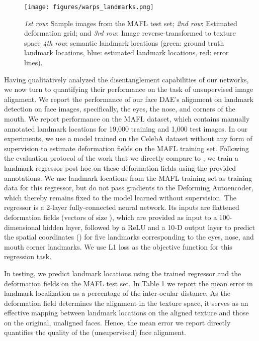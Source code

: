 \documentclass[runningheads]{llncs}
\begin{document}
\begin{figure}[!h]
    \centering
    \texttt{[image: figures/warps\_landmarks.png]}
    \caption{\emph{1st row}: Sample images from the MAFL test set; \emph{2nd row}:
    Estimated deformation grid; and \emph{3rd row}: Image reverse-transformed to texture space \emph{4th row}: semantic landmark locations (green: ground truth landmark locations, 
    blue: estimated landmark locations,
    red: error lines).}
    \label{fig:landmarksAndKeypoints}
\end{figure}
Having qualitatively analyzed the disentanglement capabilities of our networks, we now turn to quantifying their performance on the task of unsupervised image alignment. 
We report the performance of our face DAE's alignment on landmark detection on face images, specifically, the eyes, the nose, and corners of the mouth. 
We report performance on the MAFL dataset, which contains manually annotated landmark locations for 19,000 training and 1,000 test images.
In our experiments, we use a model trained on the CelebA dataset without any form of supervision to estimate deformation fields on the MAFL training set. Following the evaluation protocol of the work that we directly compare to \cite{ThewlisBV17a}, we train a landmark regressor post-hoc on these deformation fields using the provided annotations. We use landmark locations from the MAFL training set  as training data for this regressor, but do not pass gradients to the Deforming Autoencoder, which thereby remains fixed to the model learned without supervision. The regressor is a  2-layer fully-connected neural network. Its inputs are flattened deformation
  fields (vectors of size ), which are provided as input to a 100-dimensional hidden layer, followed by a ReLU and a 10-D output layer to predict the spatial coordinates () for five landmarks corresponding to the eyes, nose, and mouth corner landmarks. We use L1 loss as the objective function for this regression task.
  
In testing, we predict landmark locations using the trained regressor and the deformation fields on the MAFL test set. In Table 1 we report the mean error in landmark localization as a percentage of the inter-ocular distance. 
As the deformation field determines the alignment in the texture space, it serves as an effective mapping between landmark locations
on the aligned texture and those on the original, unaligned faces. Hence, the mean error we report directly quantifies the quality of
the (unsupervised) face alignment.  
  
\end{document}
